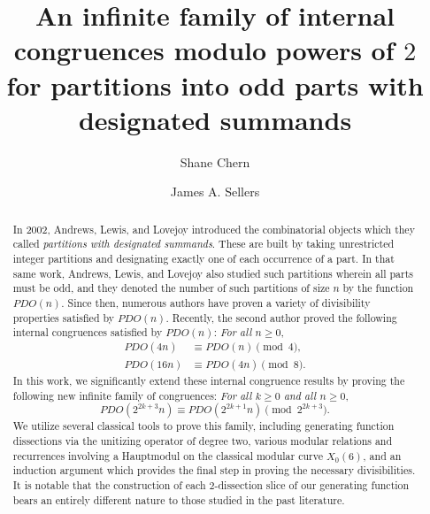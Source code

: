 \documentclass[12pt,reqno]{amsart}
\numberwithin{equation}{section}
\theoremstyle{theorem}
\theoremstyle{definition}
\begin{document}
	
\title[Partitions into odd parts with designated summands]{An infinite family of internal congruences modulo powers of $2$ for partitions into odd parts with designated summands}
	
\author[S. Chern]{Shane Chern}
\address[S. Chern]{Department of Mathematics and Statistics, Dalhousie University, Halifax, NS, B3H 4R2, Canada}

\author[J. A. Sellers]{James A. Sellers}
\address[J. A. Sellers]{Department of Mathematics and Statistics, University of Minnesota Duluth, Duluth, MN 55812, USA}
	
	
	
\maketitle

\begin{abstract}
In 2002, Andrews, Lewis, and Lovejoy introduced the combinatorial objects which they called \emph{partitions with designated summands}.  These are built by taking unrestricted integer partitions and designating exactly one of each occurrence of a part.  In that same work, Andrews, Lewis, and Lovejoy also studied such partitions wherein all parts must be odd, and they denoted the number of such partitions of size $n$ by the function $PDO(n)$.  Since then, numerous authors have proven a variety of divisibility properties satisfied by $PDO(n)$. Recently, the second author proved the following internal congruences satisfied by $PDO(n)$:  \textit{For all $n\geq 0$},
\begin{align*}
PDO(4n) &\equiv PDO(n) \pmod{4},\\
PDO(16n) &\equiv PDO(4n) \pmod{8}.  
\end{align*}
In this work, we significantly extend these internal congruence results by proving the following new infinite family of congruences:  
\textit{For all $k\geq 0$ and all $n\geq 0$}, 
$$PDO(2^{2k+3}n) \equiv PDO(2^{2k+1}n) \pmod{2^{2k+3}}.$$ 
We utilize several classical tools to prove this family, including generating function dissections via the unitizing operator of degree two, various modular relations and recurrences involving a Hauptmodul on the classical modular curve $X_0(6)$, and an induction argument which provides the final step in proving the necessary divisibilities. It is notable that the construction of each $2$-dissection slice of our generating function bears an entirely different nature to those studied in the past literature.
\end{abstract}
\end{document}
